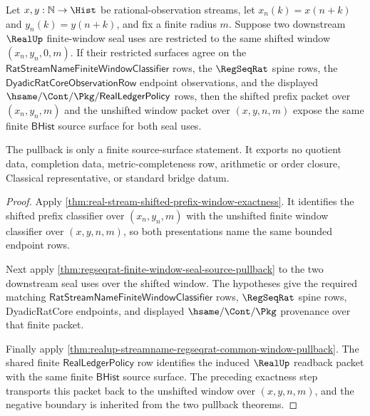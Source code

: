 \begin{theorem}
\label{thm:real-stream-shifted-prefix-window-seal-pullback}
Let $x,y:\mathbb{N}\to\Hist$ be rational-observation streams, let
$x_n(k)=x(n+k)$ and $y_n(k)=y(n+k)$, and fix a finite radius $m$. Suppose two
downstream $\RealUp$ finite-window seal uses are restricted to the same shifted
window $(x_n,y_n,0,m)$. If their restricted surfaces agree on the
$\mathsf{RatStreamNameFiniteWindowClassifier}$ rows, the $\RegSeqRat$ spine
rows, the $\mathsf{DyadicRatCoreObservationRow}$ endpoint observations, and the
displayed $\hsame/\Cont/\Pkg/\mathsf{RealLedgerPolicy}$ rows, then the shifted
prefix packet over $(x_n,y_n,m)$ and the unshifted window packet over
$(x,y,n,m)$ expose the same finite $\mathsf{BHist}$ source surface for both
seal uses.

The pullback is only a finite source-surface statement. It exports no quotient
data, completion data, metric-completeness row, arithmetic or order closure,
Classical representative, or standard bridge datum.
\end{theorem}
\begin{proof}
Apply \autoref{thm:real-stream-shifted-prefix-window-exactness}. It identifies
the shifted prefix classifier over $(x_n,y_n,m)$ with the unshifted finite
window classifier over $(x,y,n,m)$, so both presentations name the same bounded
endpoint rows.

Next apply \autoref{thm:regseqrat-finite-window-seal-source-pullback} to the two
downstream seal uses over the shifted window. The hypotheses give the required
matching $\mathsf{RatStreamNameFiniteWindowClassifier}$ rows, $\RegSeqRat$ spine
rows, DyadicRatCore endpoints, and displayed $\hsame/\Cont/\Pkg$ provenance
over that finite packet.

Finally apply \autoref{thm:realup-streamname-regseqrat-common-window-pullback}.
The shared finite $\mathsf{RealLedgerPolicy}$ row identifies the induced
$\RealUp$ readback packet with the same finite $\mathsf{BHist}$ source surface.
The preceding exactness step transports this packet back to the unshifted window
over $(x,y,n,m)$, and the negative boundary is inherited from the two pullback
theorems.
\end{proof}

